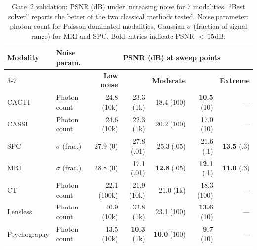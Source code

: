 \documentclass[11pt]{article}
\theoremstyle{definition}
\begin{document}
\begin{table}[htbp]
\centering
\caption{Gate~2 validation: PSNR (dB) under increasing noise for 7
modalities.  ``Best solver'' reports the better of the two classical
methods tested.  Noise parameter: photon count for Poisson-dominated
modalities, Gaussian $\sigma$ (fraction of signal range) for
MRI and SPC.  Bold entries indicate PSNR ${<}\,15$\,dB.}
\label{tab:gate2}
\small
\begin{tabular}{l l r r r r r}
\toprule
\textbf{Modality} & \textbf{Noise param.} &
  \multicolumn{5}{c}{\textbf{PSNR (dB) at sweep points}} \\
\cmidrule(lr){3-7}
 & & \textbf{Low noise} & & \textbf{Moderate} & & \textbf{Extreme} \\
\midrule
CACTI & Photon count
  & 24.8 \scriptsize{(10k)} & 23.3 \scriptsize{(1k)} & 18.4 \scriptsize{(100)} & \textbf{10.5} \scriptsize{(10)} & --- \\
CASSI & Photon count
  & 24.6 \scriptsize{(10k)} & 22.3 \scriptsize{(1k)} & 20.2 \scriptsize{(100)} & 17.0 \scriptsize{(10)} & --- \\
SPC & $\sigma$ (frac.)
  & 27.9 \scriptsize{(0)} & 27.8 \scriptsize{(.01)} & 25.3 \scriptsize{(.05)} & 21.6 \scriptsize{(.1)} & \textbf{13.5} \scriptsize{(.3)} \\
MRI & $\sigma$ (frac.)
  & 28.8 \scriptsize{(0)} & 17.1 \scriptsize{(.01)} & \textbf{12.8} \scriptsize{(.05)} & \textbf{12.1} \scriptsize{(.1)} & \textbf{11.0} \scriptsize{(.3)} \\
CT & Photon count
  & 22.1 \scriptsize{(100k)} & 21.9 \scriptsize{(10k)} & 21.0 \scriptsize{(1k)} & 18.3 \scriptsize{(100)} & --- \\
Lensless & Photon count
  & 40.9 \scriptsize{(10k)} & 32.8 \scriptsize{(1k)} & 23.1 \scriptsize{(100)} & \textbf{13.6} \scriptsize{(10)} & --- \\
Ptychography & Photon count
  & 13.5 \scriptsize{(10k)} & \textbf{10.3} \scriptsize{(1k)} & \textbf{10.0} \scriptsize{(100)} & \textbf{9.7} \scriptsize{(10)} & --- \\
\bottomrule
\end{tabular}
\end{table}
\end{document}

